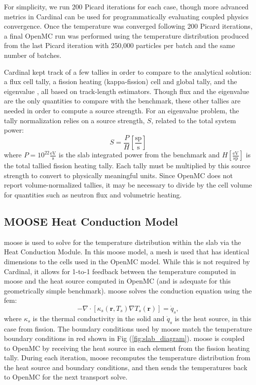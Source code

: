 \documentclass[letterpaper]{mc2023}
\begin{document}
For simplicity, we run 200 Picard iterations for each case, though more advanced metrics in Cardinal can be used for programmatically
evaluating coupled physics convergence. Once the temperature was converged following 200 Picard iterations, a final OpenMC run was
performed using the temperature distribution produced from the last Picard iteration with 250,000 particles per batch and the same
number of batches.

Cardinal kept track of a few tallies in order to compare to the analytical solution: a flux cell tally, a fission heating (kappa-fission)
cell and global tally, and the eigenvalue \keff, all based on track-length estimators. Though flux and the eigenvalue are the only quantities
to compare with the benchmark, these other tallies are needed in order to compute a source strength. For an eigenvalue problem, the tally
normalization relies on a source strength, $S$, related to the total system power:
\begin{equation} \label{eq:source_strength}
   S = \frac{P}{H} \left[\frac{\textrm{sp}}{\textrm{s}} \right]
\end{equation}
where $P=10^{22} \frac{\textrm{eV}}{\textrm{s}}$ is the slab integrated power from the benchmark and $H \left[\frac{\textrm{eV}}{\textrm{sp}} \right]$
is the total tallied fission heating tally. Each tally must be multiplied by this source strength to convert to physically meaningful units.
Since OpenMC does not report volume-normalized tallies, it may be necessary to divide by the cell volume for quantities such as neutron flux and
volumetric heating.

\subsection{MOOSE Heat Conduction Model}
\gls{moose} is used to solve for the temperature distribution within the slab via the Heat Conduction Module. In this \gls{moose}
model, a mesh is used that has identical dimensions to the cells used in the OpenMC model. While this is not required by Cardinal,
it allows for 1-to-1 feedback between the temperature computed in \gls{moose} and the heat source computed in OpenMC (and is
adequate for this geometrically simple benchmark). \gls{moose} solves the conduction equation using the \gls{fem}:
\begin{equation}\label{eq:conduction}
    - \nabla \cdot [\kappa_{s}(\mathbf{r},T_{s}) \nabla T_{s}(\mathbf{r})] = \dot{q}_{s},
\end{equation}
where $\kappa_{s}$ is the thermal conductivity in the solid and $\dot{q}_{s}$ is the heat source, in this case from fission. The
boundary conditions used by \gls{moose} match the temperature boundary conditions in red shown in Fig (\ref{fig:slab_diagram}).
\gls{moose} is coupled to OpenMC by receiving the heat source in each element from the fission heating tally. During each iteration,
\gls{moose} recomputes the temperature distribution from the heat source and boundary conditions, and then sends the temperatures
back to OpenMC for the next transport solve.
\end{document}
